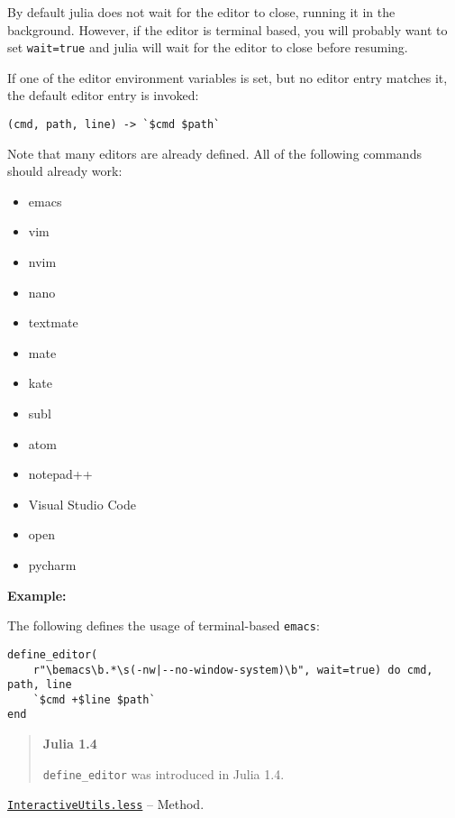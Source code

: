 \begin{adjustwidth}{2em}{0pt}
By default julia does not wait for the editor to close, running it in the background. However, if the editor is terminal based, you will probably want to set \texttt{wait=true} and julia will wait for the editor to close before resuming.

If one of the editor environment variables is set, but no editor entry matches it, the default editor entry is invoked:


\begin{lstlisting}
(cmd, path, line) -> `$cmd $path`
\end{lstlisting}

Note that many editors are already defined. All of the following commands should already work:

\begin{itemize}
\item emacs


\item vim


\item nvim


\item nano


\item textmate


\item mate


\item kate


\item subl


\item atom


\item notepad++


\item Visual Studio Code


\item open


\item pycharm

\end{itemize}
\textbf{Example:}

The following defines the usage of terminal-based \texttt{emacs}:


\begin{lstlisting}
define_editor(
    r"\bemacs\b.*\s(-nw|--no-window-system)\b", wait=true) do cmd, path, line
    `$cmd +$line $path`
end
\end{lstlisting}

\begin{quote}
\textbf{Julia 1.4}

\texttt{define\_editor} was introduced in Julia 1.4.

\end{quote}


\end{adjustwidth}
\hypertarget{449855233258666437}{} 
\hyperlink{449855233258666437}{\texttt{InteractiveUtils.less}}  -- {Method.}


